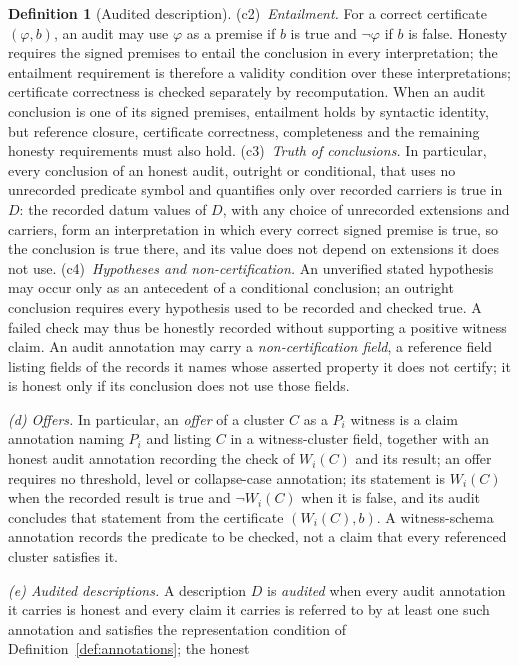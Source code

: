 \documentclass[11pt]{article}
\theoremstyle{definition}
\newtheorem{definition}[theorem]{Definition}
\begin{document}
\begin{definition}[Audited description]
(c2)~\emph{Entailment.} For a correct certificate
\((\varphi,b)\), an audit may use \(\varphi\) as a premise if \(b\) is true
and \(\neg\varphi\) if \(b\) is false. Honesty requires the signed premises to entail the conclusion in every
interpretation; the entailment requirement is therefore a validity condition over these interpretations; certificate correctness is checked separately by recomputation. When an audit conclusion is one of its signed premises, entailment holds by syntactic identity, but reference closure, certificate correctness, completeness and the remaining honesty requirements must also hold. (c3)~\emph{Truth of conclusions.} In particular, every conclusion of an honest audit, outright or conditional, that uses no unrecorded predicate
symbol and quantifies only over recorded carriers is true in \(D\): the recorded
datum values of \(D\), with any choice of unrecorded extensions and carriers,
form an interpretation in which every correct signed premise is true, so the
conclusion is true there, and its value does not depend on extensions it does
not use. (c4)~\emph{Hypotheses and non-certification.} An unverified stated hypothesis may occur only as
an antecedent of a conditional conclusion; an outright conclusion requires
every hypothesis used to be recorded and checked true. A failed check may thus
be honestly recorded without supporting a positive witness claim. An audit
annotation may carry a \emph{non-certification field}, a reference field
listing fields of the
records it names whose asserted property it does not certify; it is honest
only if its conclusion does not use those fields.
\par\emph{(d) Offers.} In particular, an \emph{offer} of a cluster \(C\) as a \(P_i\)
witness is a claim annotation naming \(P_i\) and listing \(C\) in a
witness-cluster field, together with an honest
audit annotation recording the check of \(W_i(C)\) and its result; an offer
requires no threshold, level or collapse-case annotation; its statement is
\(W_i(C)\) when the recorded result is true and \(\neg W_i(C)\) when it is false,
and its audit concludes that statement from the certificate \((W_i(C),b)\). A
witness-schema annotation records the predicate to be checked, not a claim
that every referenced cluster satisfies it.
\par\emph{(e) Audited descriptions.} A description \(D\) is
\emph{audited} when every audit annotation it carries is honest and every
claim it carries is referred to by at least one such annotation and
satisfies the representation condition of Definition~\ref{def:annotations}; the honest

\end{definition}
\end{document}

